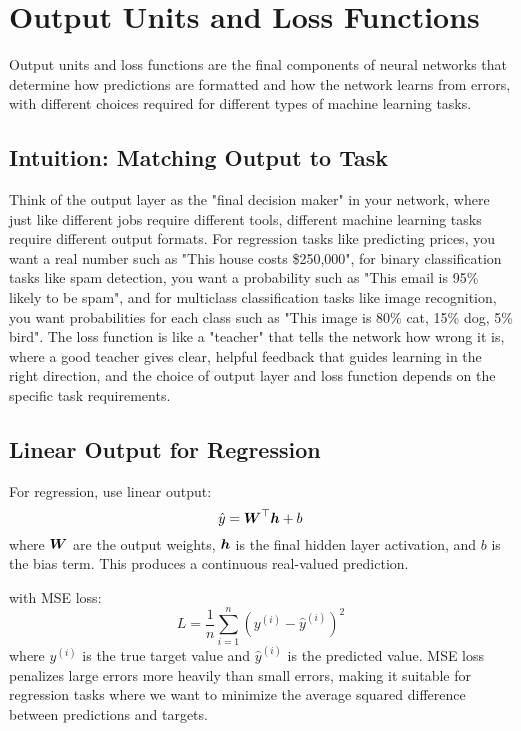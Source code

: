 
\section{Output Units and Loss Functions }
\label{sec:output-loss}

Output units and loss functions are the final components of neural networks that determine how predictions are formatted and how the network learns from errors, with different choices required for different types of machine learning tasks.

\subsection{Intuition: Matching Output to Task}

Think of the output layer as the "final decision maker" in your network, where just like different jobs require different tools, different machine learning tasks require different output formats. For regression tasks like predicting prices, you want a real number such as "This house costs \$250,000", for binary classification tasks like spam detection, you want a probability such as "This email is 95\% likely to be spam", and for multiclass classification tasks like image recognition, you want probabilities for each class such as "This image is 80\% cat, 15\% dog, 5\% bird". The loss function is like a "teacher" that tells the network how wrong it is, where a good teacher gives clear, helpful feedback that guides learning in the right direction, and the choice of output layer and loss function depends on the specific task requirements.

\subsection{Linear Output for Regression}

For regression, use linear output:
\begin{equation}
\hat{y} = \boldsymbol{W}^\top \boldsymbol{h} + b
\end{equation}
where $\boldsymbol{W}$ are the output weights, $\boldsymbol{h}$ is the final hidden layer activation, and $b$ is the bias term. This produces a continuous real-valued prediction.

with MSE loss:
\begin{equation}
L = \frac{1}{n} \sum_{i=1}^{n} (y^{(i)} - \hat{y}^{(i)})^2
\end{equation}
where $y^{(i)}$ is the true target value and $\hat{y}^{(i)}$ is the predicted value. MSE loss penalizes large errors more heavily than small errors, making it suitable for regression tasks where we want to minimize the average squared difference between predictions and targets.

